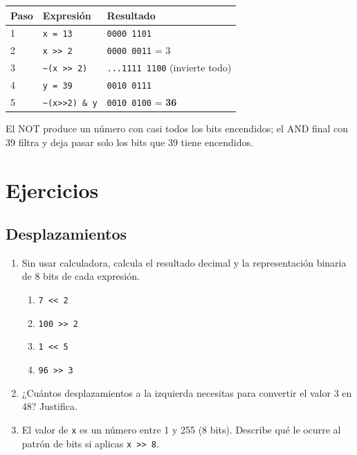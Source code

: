 \documentclass[12pt, oneside]{article}
\begin{document}
\begin{ejemplo}
\begin{center}
\begin{tabular}{lll}
  \toprule
  \textbf{Paso} & \textbf{Expresión} & \textbf{Resultado} \\
  \midrule
  1 & \texttt{x = 13}                        & \texttt{0000 1101} \\
  2 & \texttt{x >> 2}                        & \texttt{0000 0011} = 3 \\
  3 & \texttt{\textasciitilde(x >> 2)}        & \texttt{...1111 1100} (invierte todo) \\
  4 & \texttt{y = 39}                        & \texttt{0010 0111} \\
  5 & \texttt{\textasciitilde(x>>2) \& y}    & \texttt{0010 0100} = \textbf{36} \\
  \bottomrule
\end{tabular}
\end{center}
El NOT produce un número con casi todos los bits encendidos; el AND final
con 39 filtra y deja pasar solo los bits que 39 tiene encendidos.
\end{ejemplo}

\section{Ejercicios}

\subsection{Desplazamientos}

\begin{enumerate}

  \item Sin usar calculadora, calcula el resultado decimal y la representación
        binaria de 8 bits de cada expresión.
        \begin{enumerate}
          \item \texttt{7 << 2}
          \item \texttt{100 >> 2}
          \item \texttt{1 << 5}
          \item \texttt{96 >> 3}
        \end{enumerate}

  \item ¿Cuántos desplazamientos a la izquierda necesitas para convertir
        el valor 3 en 48? Justifica.

  \item El valor de \texttt{x} es un número entre 1 y 255 (8 bits).
        Describe qué le ocurre al patrón de bits si aplicas \texttt{x >> 8}.

\end{enumerate}
\end{document}
